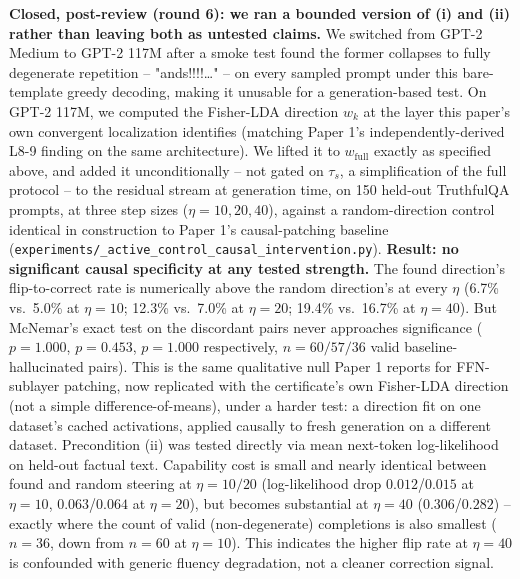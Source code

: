 \documentclass[onecolumn]{jmlr}
\begin{document}
\textbf{Closed, post-review (round 6): we ran a bounded version of (i)
and (ii) rather than leaving both as untested claims.} We switched from
GPT-2 Medium to GPT-2 117M after a smoke test found the former
collapses to fully degenerate repetition -- "ands!!!!\ldots" -- on
every sampled prompt under this bare-template greedy decoding, making
it unusable for a generation-based test. On GPT-2 117M, we computed
the Fisher-LDA direction $w_k$ at the layer this paper's own
convergent localization identifies (matching Paper 1's
independently-derived L8-9 finding on the same architecture). We
lifted it to $w_{\text{full}}$ exactly as specified above, and added
it unconditionally -- not gated on $\tau_s$, a simplification of the
full protocol -- to the residual stream at generation time, on 150
held-out TruthfulQA prompts, at three step sizes ($\eta=10,20,40$),
against a random-direction control identical in construction to
Paper 1's causal-patching baseline
(\texttt{experiments/\allowbreak {}\_\allowbreak \allowbreak active\_\allowbreak \allowbreak control\_\allowbreak \allowbreak causal\_\allowbreak \allowbreak intervention.py}).
\textbf{Result: no significant causal specificity at any tested
strength.} The found direction's flip-to-correct rate is numerically
above the random direction's at every $\eta$ (6.7\% vs.\ 5.0\% at
$\eta=10$; 12.3\% vs.\ 7.0\% at $\eta=20$; 19.4\% vs.\ 16.7\% at
$\eta=40$). But McNemar's exact test on the discordant pairs never
approaches significance ($p=1.000$, $p=0.453$, $p=1.000$ respectively,
$n=60/57/36$ valid baseline-hallucinated pairs). This is the same
qualitative null Paper 1 reports for FFN-sublayer patching, now
replicated with the certificate's own Fisher-LDA direction (not a
simple difference-of-means), under a harder test: a direction fit on
one dataset's cached activations, applied causally to fresh generation
on a different dataset. Precondition (ii) was tested directly via mean
next-token log-likelihood on held-out factual text. Capability cost is
small and nearly identical between found and random steering at
$\eta=10/20$ (log-likelihood drop $0.012$/$0.015$ at $\eta=10$,
$0.063$/$0.064$ at $\eta=20$), but becomes substantial at $\eta=40$
($0.306$/$0.282$) -- exactly where the count of valid (non-degenerate)
completions is also smallest ($n=36$, down from $n=60$ at $\eta=10$).
This indicates the higher flip rate at $\eta=40$ is confounded with
generic fluency degradation, not a cleaner correction signal.
\end{document}
